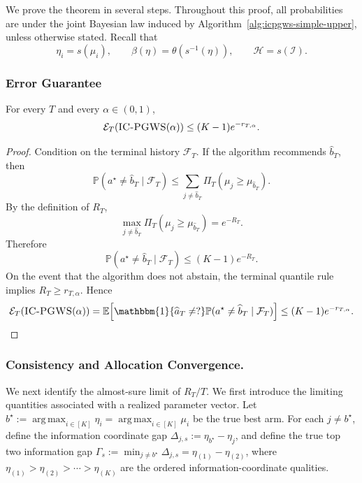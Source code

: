 \documentclass[10pt]{article}
\theoremstyle{plain}
\begin{document}
We prove the theorem in several steps.  Throughout this proof, all probabilities
are under the joint Bayesian law induced by
Algorithm~\ref{alg:icpgws-simple-upper}, unless otherwise stated.  Recall that
\[
    \eta_i=s(\mu_i),
    \qquad
    \beta(\eta)=\theta(s^{-1}(\eta)),
    \qquad
    \mathcal H=s(\mathcal I).
\]

\subsubsection{Error Guarantee}

\begin{lemma}
\label{lem:posterior-certification-simple-upper}
For every \(T\) and every \(\alpha\in(0,1)\),
\[
    \mathcal E_T(\textsc{IC-PGWS}(\alpha))
    \le
    (K-1)e^{-r_{T,\alpha}}.
\]
\end{lemma}

\begin{proof}
Condition on the terminal history \(\mathcal F_T\).  If the algorithm recommends
\(\widehat b_T\), then
\[
    \mathbb P(a^\star\neq \widehat b_T\mid\mathcal F_T)
    \le
    \sum_{j\neq \widehat b_T}
    \varPi_T(\mu_j\ge \mu_{\widehat b_T}).
\]
By the definition of \(R_T\),
\[
    \max_{j\neq\widehat b_T}
    \varPi_T(\mu_j\ge \mu_{\widehat b_T})
    =
    e^{-R_T}.
\]
Therefore
\[
    \mathbb P(a^\star\neq \widehat b_T\mid\mathcal F_T)
    \le
    (K-1)e^{-R_T}.
\]
On the event that the algorithm does not abstain, the terminal quantile rule
implies \(R_T\ge r_{T,\alpha}\).  Hence
\[
\begin{aligned}
    \mathcal E_T(\textsc{IC-PGWS}(\alpha))
    =
    \mathbb E\!\left[
        \mathbbm{1}\{\widehat a_T\neq ?\}
        \mathbb P(a^\star\neq \widehat b_T\mid\mathcal F_T)
    \right]  
    \le
    (K-1)e^{-r_{T,\alpha}}. 
\end{aligned}
\]

\end{proof}

\subsubsection{Consistency and Allocation Convergence.}

We next identify the almost-sure limit of \(R_T/T\). We first introduce the
limiting quantities associated with a realized parameter vector. Let
    $b^\star
    :=
    \operatorname*{arg\,max}_{i\in[K]}\eta_i
    =
    \operatorname*{arg\,max}_{i\in[K]}\mu_i$
be the true best arm. For each \(j\neq b^\star\), define the information coordinate
gap
    $\Delta_{j,s}
    :=
    \eta_{b^\star}-\eta_j$,
and define the true top two information gap
    $\Gamma_s
    :=
    \min_{j\neq b^\star}\Delta_{j,s}
    =
    \eta_{(1)}-\eta_{(2)}$,
where \(\eta_{(1)}>\eta_{(2)}>\cdots>\eta_{(K)}\) are the ordered
information-coordinate qualities.
\end{document}

